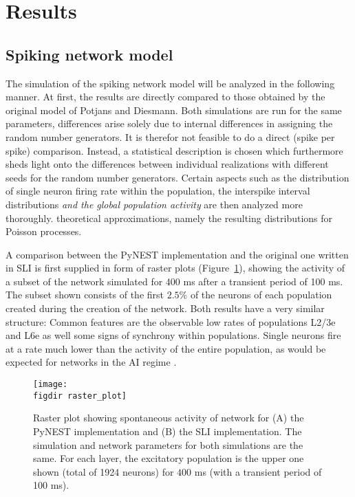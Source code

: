 \section{Results}
\label{sec:results}

\subsection{Spiking network model}
The simulation of the spiking network model will be analyzed in the following manner. 
At first, the results are directly compared to those obtained by the original 
model of Potjans and Diesmann. Both simulations are run for the same parameters, 
differences arise solely due to internal differences in assigning the random 
number generators. It is therefor not feasible to do a direct (spike per spike) 
comparison. Instead, a statistical description is chosen which furthermore sheds light
onto the differences between individual realizations with different seeds for the 
random number generators. Certain aspects such as
the distribution of single neuron firing rate within the population, 
the interspike interval distributions 
\emph{and the global population activity} 
are then analyzed more thoroughly. 
theoretical approximations, namely the resulting distributions 
for Poisson processes.

A comparison between the PyNEST implementation and the original one written in SLI
is first supplied in form of raster plots (Figure~\ref{fig:raster_plot}), 
showing the activity of a subset of the network simulated for 400 ms 
after a transient period of 100 ms. The subset shown consists of the first 
$2.5 \%$ of the neurons of each population created during the creation of the network. 
Both results have a very similar structure: Common features are the observable low 
rates of populations L2/3e and L6e as well some signs of synchrony within populations. 
Single neurons fire at a rate much lower than the activity of the 
entire population, as would be expected for networks in the AI regime \cite{brunel2000}. 
\begin{figure}[tb]
    \centering
    \texttt{[image: \\figdir raster\_plot]}
    \caption{Raster plot showing spontaneous activity of network for 
        (A) the PyNEST implementation and (B) the SLI implementation.
        The simulation and network parameters for both simulations are 
        the same. 
        For each layer, the excitatory population is the upper one shown 
        (total of 1924 neurons) for $400$ ms (with a transient period of 100 ms). 
    }
    \label{fig:raster_plot}
\end{figure}

